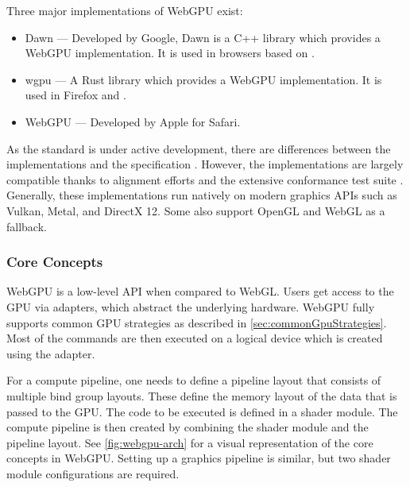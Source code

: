 Three major implementations of \gls{WebGPU} exist:

\begin{itemize}
  \item{\gls{Dawn}} \cite{dawnImplementation} — Developed by Google, \gls{Dawn} is a C++ library which provides a \gls{WebGPU} implementation. It is used in browsers based on .
  \item{\gls{wgpu}} \cite{wgpuImplementation} — A Rust library which provides a \gls{WebGPU} implementation. It is used in Firefox and .
  \item{ \gls{WebGPU}} \cite{webKitWebGPUImplementation} — Developed by Apple for Safari.
\end{itemize}

As the standard is under active development, there are differences between the implementations and the specification \cite{wgpuStandardDeviation}. However, the implementations are largely compatible thanks to alignment efforts and the extensive conformance test suite \cite{WebGPUConformanceTestSuite}. Generally, these implementations run natively on modern graphics \glspl{API} such as \gls{Vulkan}, \gls{Metal}, and \gls{DirectX 12}. Some also support \gls{OpenGL} and \gls{WebGL} as a fallback.

\subsubsection{Core Concepts}

\gls{WebGPU} is a low-level \gls{API} when compared to \gls{WebGL}. Users get access to the \gls{GPU} via adapters, which abstract the underlying hardware. \gls{WebGPU} fully supports common \gls{GPU} strategies as described in \autoref{sec:commonGpuStrategies}. Most of the commands are then executed on a logical device which is created using the adapter.

For a compute pipeline, one needs to define a pipeline layout that consists of multiple bind group layouts. These define the memory layout of the data that is passed to the \gls{GPU}. The code to be executed is defined in a shader module. The compute pipeline is then created by combining the shader module and the pipeline layout. See \autoref{fig:webgpu-arch} for a visual representation of the core concepts in \gls{WebGPU}. Setting up a graphics pipeline is similar, but two shader module configurations are required.

